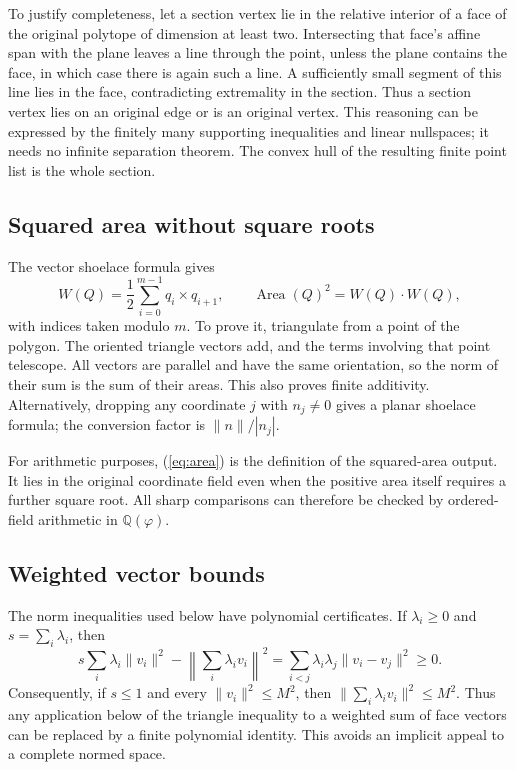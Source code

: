 \documentclass[11pt,letterpaper]{article}
\theoremstyle{definition}\newtheorem{definition}[theorem]{Definition}
\newcommand{\Area}{\operatorname{Area}}
\newcommand{\QQ}{\mathbb Q}
\begin{document}
To justify completeness, let a section vertex lie in the relative
interior of a face of the original polytope of dimension at least two.
Intersecting that face's affine span with the plane leaves a line
through the point, unless the plane contains the face, in which case
there is again such a line. A sufficiently small segment of this line
lies in the face, contradicting extremality in the section. Thus a
section vertex lies on an original edge or is an original vertex.
This reasoning can be expressed by the finitely many supporting
inequalities and linear nullspaces; it needs no infinite separation
theorem. The convex hull of the resulting finite point list is the
whole section.

\subsection{Squared area without square roots}
The vector shoelace formula gives
\begin{equation}
 W(Q)=\frac12\sum_{i=0}^{m-1}q_i\times q_{i+1},
 \qquad \Area(Q)^2=W(Q)\cdot W(Q),                 \label{eq:area}
\end{equation}
with indices taken modulo $m$. To prove it, triangulate from a point
of the polygon. The oriented triangle vectors add, and the terms
involving that point telescope. All vectors are parallel and have
the same orientation, so the norm of their sum is the sum of their
areas. This also proves finite additivity. Alternatively, dropping
any coordinate $j$ with $n_j\ne0$ gives a planar shoelace formula;
the conversion factor is $\|n\|/|n_j|$.

For arithmetic purposes, (\ref{eq:area}) is the definition of the
squared-area output. It lies in the original coordinate field even
when the positive area itself requires a further square root.
All sharp comparisons can therefore be checked by ordered-field
arithmetic in $\QQ(\varphi)$.

\subsection{Weighted vector bounds}
The norm inequalities used below have polynomial certificates. If
$\lambda_i\ge0$ and $s=\sum_i\lambda_i$, then
\begin{equation}
 s\sum_i\lambda_i\|v_i\|^2-
   \left\|\sum_i\lambda_i v_i\right\|^2
 =\sum_{i<j}\lambda_i\lambda_j\|v_i-v_j\|^2\ge0.
                                                               \label{eq:variance}
\end{equation}
Consequently, if $s\le1$ and every $\|v_i\|^2\le M^2$, then
$\|\sum_i\lambda_i v_i\|^2\le M^2$.
Thus any application below of the triangle inequality to a weighted
sum of face vectors can be replaced by a finite polynomial identity.
This avoids an implicit appeal to a complete normed space.
\end{document}
